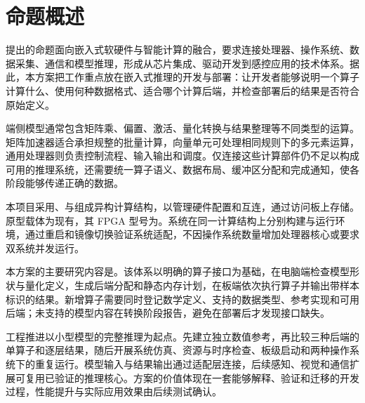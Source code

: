 \section{命题概述}
\ChallengeCompany{}提出的命题面向嵌入式软硬件与智能计算的融合，要求连接处理器、操作系统、数据采集、通信和模型推理，形成从芯片集成、驱动开发到感控应用的技术体系。\cite{challenge}据此，本方案把工作重点放在嵌入式推理的开发与部署：让开发者能够说明一个算子计算什么、使用何种数据格式、适合哪个计算后端，并检查部署后的结果是否符合原始定义。

端侧模型通常包含矩阵乘、偏置、激活、量化转换与结果整理等不同类型的运算。矩阵加速器适合承担规整的批量计算，向量单元可处理相同规则下的多元素运算，通用处理器则负责控制流程、输入输出和调度。仅连接这些计算部件仍不足以构成可用的推理系统，还需要统一算子语义、数据布局、缓冲区分配和完成通知，使各阶段能够传递正确的数据。\cite{saturn,gemmini}

本项目采用\ProcessorCore{}、\VectorUnit{}与\AcceleratorName{}组成异构计算结构，以\IntegrationFramework{}管理硬件配置和互连，通过\MemoryController{}访问板上存储。原型载体为现有\BoardModel{}，其 FPGA 型号为\texttt{\FPGAModel}。系统在同一计算结构上分别构建\RealTimeSystem{}与\LinuxDistribution{}运行环境，通过重启和镜像切换验证系统适配，不因操作系统数量增加处理器核心或要求双系统并发运行。\cite{technicalreport}

本方案的主要研究内容是\RuntimeName{}。该体系以明确的算子接口为基础，在电脑端检查模型形状与量化定义，生成后端分配和静态内存计划，在板端依次执行算子并输出带样本标识的结果。新增算子需要同时登记数学定义、支持的数据类型、参考实现和可用后端；未支持的模型内容在转换阶段报告，避免在部署后才发现接口缺失。

工程推进以小型模型的完整推理为起点。先建立独立数值参考，再比较三种后端的单算子和逐层结果，随后开展系统仿真、资源与时序检查、板级启动和两种操作系统下的重复运行。模型输入与结果输出通过适配层连接，后续感知、视觉和通信扩展可复用已验证的推理核心。方案的价值体现在一套能够解释、验证和迁移的开发过程，性能提升与实际应用效果由后续测试确认。
